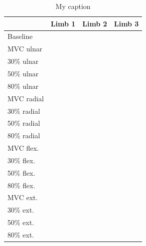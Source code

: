 \begin{table}[]
	\centering
	\caption{My caption}
	\label{my-label}
	\begin{tabular}{|l|l|l|l|}
		\hline
		& Limb 1 & Limb 2 & Limb 3 \\ \hline
		Baseline    &        &        &        \\ \hline
		MVC ulnar   &        &        &        \\ \hline
		30\% ulnar  &        &        &        \\ \hline
		50\% ulnar  &        &        &        \\ \hline
		80\% ulnar  &        &        &        \\ \hline
		MVC radial  &        &        &        \\ \hline
		30\% radial &        &        &        \\ \hline
		50\% radial &        &        &        \\ \hline
		80\% radial &        &        &        \\ \hline
		MVC flex.   &        &        &        \\ \hline
		30\% flex.  &        &        &        \\ \hline
		50\% flex.  &        &        &        \\ \hline
		80\% flex.  &        &        &        \\ \hline
		MVC ext.    &        &        &        \\ \hline
		30\% ext.   &        &        &        \\ \hline
		50\% ext.   &        &        &        \\ \hline
		80\% ext.   &        &        &        \\ \hline
	\end{tabular}
\end{table}